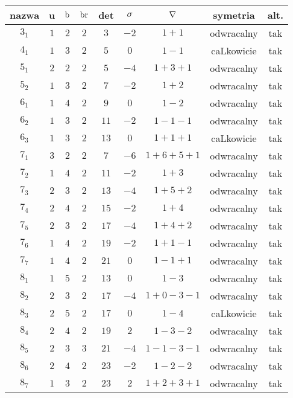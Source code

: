 
\renewcommand*{\arraystretch}{1.4}
\footnotesize
\begin{longtable}{ccccccccc}
\hline
nazwa & u & $\operatorname{b}$ & $\operatorname{br}$ & det & $\sigma$ & $\nabla$ & symetria & alt. \\ \hline
\endhead %
$3_{1}$ & $1$ & $2$ & $2$ & $3$ & $-2$ & $1+1$ & odwracalny & tak \\
$4_{1}$ & $1$ & $3$ & $2$ & $5$ & $0$ & $1-1$ & caLkowicie & tak \\
$5_{1}$ & $2$ & $2$ & $2$ & $5$ & $-4$ & $1+3+1$ & odwracalny & tak \\
$5_{2}$ & $1$ & $3$ & $2$ & $7$ & $-2$ & $1+2$ & odwracalny & tak \\
$6_{1}$ & $1$ & $4$ & $2$ & $9$ & $0$ & $1-2$ & odwracalny & tak \\
$6_{2}$ & $1$ & $3$ & $2$ & $11$ & $-2$ & $1-1-1$ & odwracalny & tak \\
$6_{3}$ & $1$ & $3$ & $2$ & $13$ & $0$ & $1+1+1$ & caLkowicie & tak \\
$7_{1}$ & $3$ & $2$ & $2$ & $7$ & $-6$ & $1+6+5+1$ & odwracalny & tak \\
$7_{2}$ & $1$ & $4$ & $2$ & $11$ & $-2$ & $1+3$ & odwracalny & tak \\
$7_{3}$ & $2$ & $3$ & $2$ & $13$ & $-4$ & $1+5+2$ & odwracalny & tak \\
$7_{4}$ & $2$ & $4$ & $2$ & $15$ & $-2$ & $1+4$ & odwracalny & tak \\
$7_{5}$ & $2$ & $3$ & $2$ & $17$ & $-4$ & $1+4+2$ & odwracalny & tak \\
$7_{6}$ & $1$ & $4$ & $2$ & $19$ & $-2$ & $1+1-1$ & odwracalny & tak \\
$7_{7}$ & $1$ & $4$ & $2$ & $21$ & $0$ & $1-1+1$ & odwracalny & tak \\
$8_{1}$ & $1$ & $5$ & $2$ & $13$ & $0$ & $1-3$ & odwracalny & tak \\
$8_{2}$ & $2$ & $3$ & $2$ & $17$ & $-4$ & $1+0-3-1$ & odwracalny & tak \\
$8_{3}$ & $2$ & $5$ & $2$ & $17$ & $0$ & $1-4$ & caLkowicie & tak \\
$8_{4}$ & $2$ & $4$ & $2$ & $19$ & $2$ & $1-3-2$ & odwracalny & tak \\
$8_{5}$ & $2$ & $3$ & $3$ & $21$ & $-4$ & $1-1-3-1$ & odwracalny & tak \\
$8_{6}$ & $2$ & $4$ & $2$ & $23$ & $-2$ & $1-2-2$ & odwracalny & tak \\
$8_{7}$ & $1$ & $3$ & $2$ & $23$ & $2$ & $1+2+3+1$ & odwracalny & tak \\

\end{longtable}
